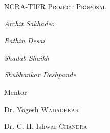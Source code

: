 \documentclass{article}
\begin{document}
\begin{titlepage}
	\centering
	\begin{figure}[H]
	\centering
	\end{figure}
	\vspace{2cm}
	{\scshape\LARGE NCRA-TIFR Project Proposal \par}
	\vspace{2cm}
	{\huge\bfseries \par}
	\vspace{2cm}
	{\Large\itshape Archit Sakhadeo\par}
	{\Large\itshape Rathin Desai\par}
	{\Large\itshape Shadab Shaikh\par}
	{\Large\itshape Shubhankar Deshpande\par}
	\vfill
	Mentor\par
	Dr. Yogesh  \textsc{Wadadekar}
	\par
	Dr. C. H. Ishwar \textsc{Chandra}

	\vfill

\end{titlepage}
\end{document}
